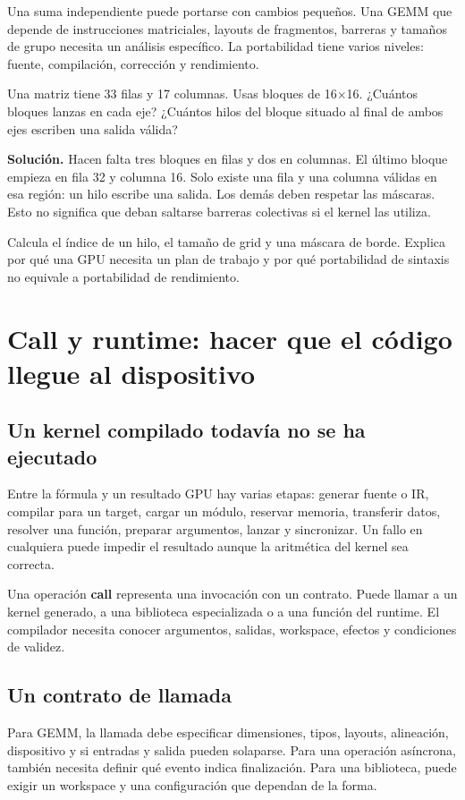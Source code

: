 \documentclass[12pt,a4paper,oneside]{report}
\begin{document}
Una suma independiente puede portarse con cambios pequeños. Una GEMM que depende de instrucciones matriciales, layouts de fragmentos, barreras y tamaños de grupo necesita un análisis específico. La portabilidad tiene varios niveles: fuente, compilación, corrección y rendimiento.

\begin{practica}
Una matriz tiene 33 filas y 17 columnas. Usas bloques de 16\ensuremath{\times}16. ¿Cuántos bloques lanzas en cada eje? ¿Cuántos hilos del bloque situado al final de ambos ejes escriben una salida válida?

\end{practica}
\textbf{Solución.} Hacen falta tres bloques en filas y dos en columnas. El último bloque empieza en fila 32 y columna 16. Solo existe una fila y una columna válidas en esa región: un hilo escribe una salida. Los demás deben respetar las máscaras. Esto no significa que deban saltarse barreras colectivas si el kernel las utiliza.

\begin{comprueba}
Calcula el índice de un hilo, el tamaño de grid y una máscara de borde. Explica por qué una GPU necesita un plan de trabajo y por qué portabilidad de sintaxis no equivale a portabilidad de rendimiento.

\end{comprueba}
\chapter{Call y runtime: hacer que el código llegue al dispositivo}
\label{ch:runtime}
\section{Un kernel compilado todavía no se ha ejecutado}
Entre la fórmula y un resultado GPU hay varias etapas: generar fuente o IR, compilar para un target, cargar un módulo, reservar memoria, transferir datos, resolver una función, preparar argumentos, lanzar y sincronizar. Un fallo en cualquiera puede impedir el resultado aunque la aritmética del kernel sea correcta.

Una operación \textbf{call} representa una invocación con un contrato. Puede llamar a un kernel generado, a una biblioteca especializada o a una función del runtime. El compilador necesita conocer argumentos, salidas, workspace, efectos y condiciones de validez.

\section{Un contrato de llamada}
Para GEMM, la llamada debe especificar dimensiones, tipos, layouts, alineación, dispositivo y si entradas y salida pueden solaparse. Para una operación asíncrona, también necesita definir qué evento indica finalización. Para una biblioteca, puede exigir un workspace y una configuración que dependan de la forma.
\end{document}
